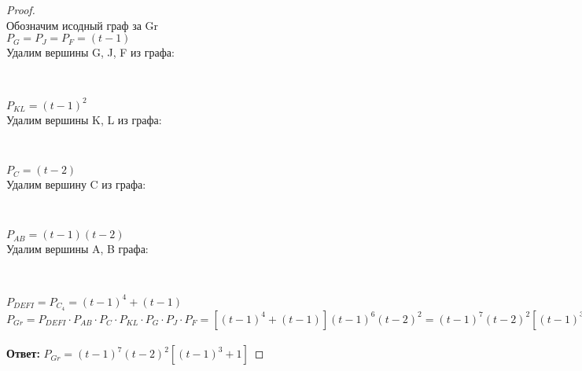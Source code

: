 \begin{proof} $ $\\
    Обозначим исодный граф за Gr\\
    $P_G = P_J = P_F = (t-1)$\\
    Удалим вершины G, J, F из графа:
    \begin{center}
    \\
    \end{center}
    $P_{KL} = (t-1)^2$\\
    Удалим вершины K, L из графа:
    \begin{center}
    \\
    \end{center}
    $P_C = (t-2)$\\
    Удалим вершину C из графа:
    \begin{center}
    \\
    \end{center}
    $P_{AB} = (t-1)(t-2)$\\
    Удалим вершины A, B графа:
    \begin{center}
    \\
    \end{center}
    $P_{DEFI} = P_{C_4} = (t-1)^4+(t-1)$\\
    $P_{Gr} = P_{DEFI} \cdot P_{AB} \cdot P_{C} \cdot P_{KL} \cdot P_G \cdot P_J \cdot P_F = [(t-1)^4+(t-1)](t-1)^6(t-2)^2 = (t-1)^7(t-2)^2[(t-1)^3 + 1]$\\\\
    \textbf{Ответ: } $P_{Gr} = (t-1)^7(t-2)^2[(t-1)^3 + 1]$
    
\end{proof}